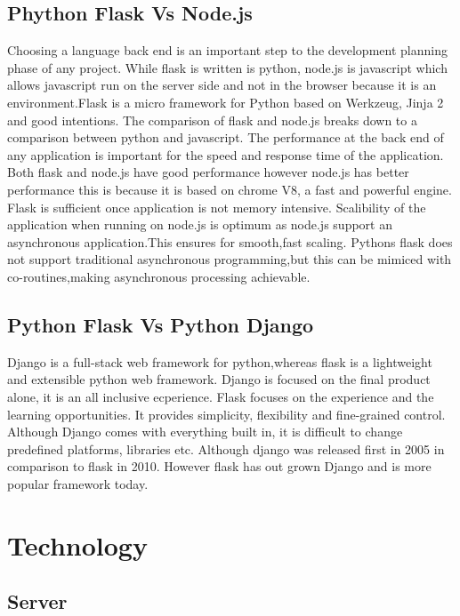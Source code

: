 \subsection{Phython Flask Vs Node.js}
Choosing a language back end is an important step to the development planning phase of any project. While flask is written is python, node.js is javascript which allows javascript run on the server side and not in the browser because it is an environment.Flask is a micro framework for Python based on Werkzeug, Jinja 2 and good intentions.\cite{flask_2019} The comparison of flask and node.js breaks down to a comparison between python and javascript. The performance at the back end of any application is important for the speed and response time of the application. Both flask and node.js have good performance however node.js has better performance this is because it is based on chrome V8, a fast and powerful engine. \cite{nodeFlaskcomparison_2019} Flask is sufficient once application is not memory intensive. Scalibility of the application when running on node.js is optimum as node.js support an asynchronous application.This ensures for smooth,fast scaling. Pythons flask does not support traditional asynchronous programming,but this can be mimiced with co-routines,making asynchronous processing achievable.\cite{python_vs_node}

\subsection{Python Flask Vs Python Django}
Django is a full-stack web framework for python,whereas flask is a lightweight and extensible python web framework. Django is focused on the final product alone, it is an all inclusive ecperience. Flask focuses on the experience and the learning opportunities. It provides simplicity, flexibility and fine-grained control. Although Django comes with everything built in, it is difficult to change predefined platforms, libraries etc. Although django was released first in 2005 in comparison to flask in 2010. However flask has out grown Django and is more popular framework today.\cite{codementor_2019}

\section{Technology}
\subsection{Server}
